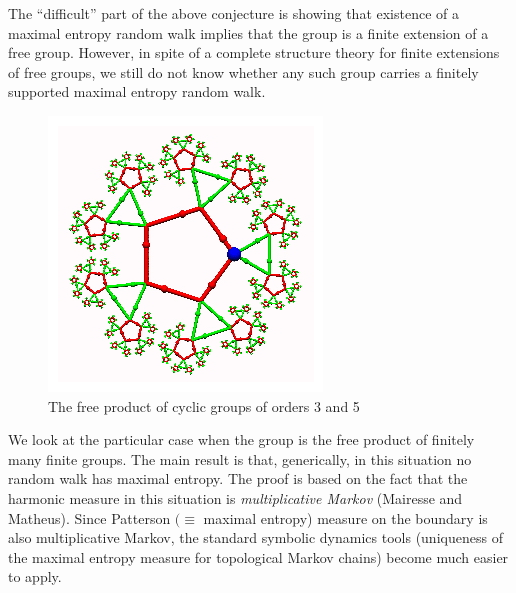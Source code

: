 The ``difficult'' part of the above conjecture is showing that
existence of a maximal entropy random walk implies that the group is
a finite extension of a free group. However, in spite of a complete
structure theory for finite extensions of free groups, we still do
not know whether any such group carries a finitely supported maximal
entropy random walk.

\begin{figure}[ht]
  \begin{center}
    \includegraphics[width=\hsize]{Kaimanovich/profkaimanovich-fig2.png}
    \caption{ The free product of cyclic groups of orders 3 and 5}\label{fig:profkaimanovich2}
   \end{center}
\end{figure}

We look at the particular case when the group is the free product of
finitely many finite groups. The main result is that, generically,
in this situation no random walk has maximal entropy. The proof is
based on the fact that the harmonic measure in this situation is
\emph{multiplicative Markov} (Mairesse and Matheus). Since Patterson
$(\equiv$ maximal entropy) measure on the boundary is also
multiplicative Markov, the standard symbolic dynamics tools
(uniqueness of the maximal entropy measure for topological Markov
chains) become much easier to apply.


